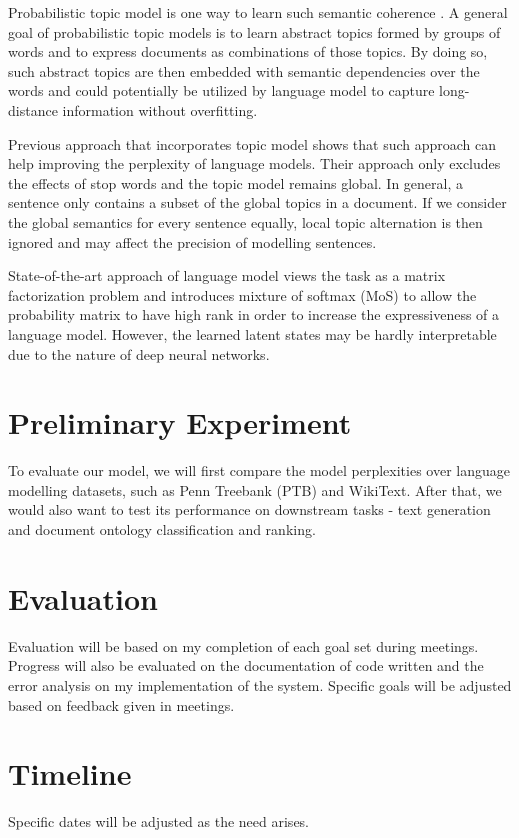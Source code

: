 \documentclass[11pt,a4paper]{article}
\begin{document}
Probabilistic topic model is one way to learn such semantic coherence \citep{blei2009topic}. A general goal of probabilistic topic models is to learn abstract topics formed by groups of words and to express documents as combinations of those topics. By doing so, such abstract topics are then embedded with semantic dependencies over the words and could potentially be utilized by language model to capture long-distance information without overfitting.

Previous approach that incorporates topic model \citep{dieng2016topicrnn} shows that such approach can help improving the perplexity of language models. Their approach only excludes the effects of stop words and the topic model remains global. In general, a sentence only contains a subset of the global topics in a document. If we consider the global semantics for every sentence equally, local topic alternation is then ignored and may affect the precision of modelling sentences.

State-of-the-art approach of language model \citep{yang2017breaking} views the task as a matrix factorization problem and introduces mixture of softmax (MoS) to allow the probability matrix to have high rank in order to increase the expressiveness of a language model. However, the learned latent states may be hardly interpretable due to the nature of deep neural networks.

\section{Preliminary Experiment}
\label{experiment}
To evaluate our model, we will first compare the model perplexities over language modelling datasets, such as Penn Treebank (PTB) and WikiText. After that, we would also want to test its performance on downstream tasks - text generation and document ontology classification and ranking.

\section{Evaluation}
\label{evaluation}
Evaluation will be based on my completion of each goal set during meetings. Progress will also be evaluated on the documentation of code written and the error analysis on my implementation of the system. Specific goals will be adjusted based on feedback given in meetings.

\section{Timeline}
\label{timeline}
Specific dates will be adjusted as the need arises.
\end{document}
